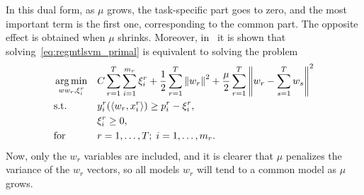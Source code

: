 In this dual form, as $\mu$ grows, the task-specific part goes to zero, and the most important term is the first one, corresponding to the common part. The opposite effect is obtained when $\mu$ shrinks.
Moreover, in~\cite{EvgeniouP04} it is shown that solving~\eqref{eq:regmtlsvm_primal} is equivalent to solving the problem
\begin{equation}
    \nonumber
    \begin{aligned}
        & \operatorname*{arg\min}_{ww_r, \xi_i^r}
        & & C \sum_{r=1}^T \sum_{i=1}^{m_r} \xi_i^r +  \frac{1}{2} \sum_{r=1}^T \left\lVert w_r\right\rVert^2 + \frac{\mu}{2} \sum_{r=1}^T  \left\lVert w_r - \sum_{s=1}^T w_s\right\rVert^2 \\
        & \text{s.t.}
        & & y_{i}^r ( \langle w_r, x_{i}^r \rangle) \geq p_i^r - \xi_i^r ,\\
        & & &\xi_i^r \geq 0, \\
        & \text{for } & & r=1, \ldots, T; \; i=1, \ldots, m_r.
    \end{aligned}
\end{equation}
Now, only the $w_r$ variables are included, and it is clearer that $\mu$ penalizes the variance of the $w_r$ vectors, so all models $w_r$ will tend to a common model as $\mu$ grows.
%

